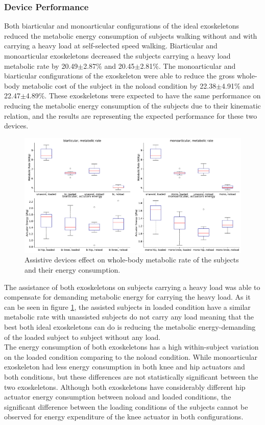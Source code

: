 \documentclass[10pt,letterpaper]{article}
\begin{document}
\subsubsection*{Device Performance}
Both biarticular and monoarticular configurations of the ideal exoskeletons reduced the metabolic energy consumption of subjects walking without and with carrying a heavy load at self-selected speed walking. Biarticular and monoarticular exoskeletons decreased the subjects carrying a heavy load metabolic rate by 20.49$\pm$2.87\% and 20.45$\pm$2.81\%. The monoarticular and biarticular configurations of the exoskeleton were able to reduce the gross whole-body metabolic cost of the subject in the noload condition by 22.38$\pm$4.91\% and 22.47$\pm$4.89\%. These exoskeletons were expected to have the same performance on reducing the metabolic energy consumption of the subjects due to their kinematic relation, and the results are representing the expected performance for these two devices.\\
\begin{figure}[h]   
	\centering
	\includegraphics[scale=0.35]{Ideal_Exo_MonovsBi_Figures/Paper_Figure_Energy_BoxPlot.pdf}
	\caption{Assistive devices effect on whole-body metabolic rate of the subjects and their energy consumption.}
	\label{Fig_IdealExo_Energy_BoxPlot}
\end{figure}
The assistance of both exoskeletons on subjects carrying a heavy load was able to compensate for demanding metabolic energy for carrying the heavy load. As it can be seen in figure \ref{Fig_IdealExo_Energy_BoxPlot}, the assisted subjects in loaded condition have a similar metabolic rate with unassisted subjects do not carry any load meaning that the best both ideal exoskeletons can do is reducing the metabolic energy-demanding of the loaded subject to subject without any load.\\
The energy consumption of both exoskeletons has a high within-subject variation on the loaded condition comparing to the noload condition. While monoarticular exoskeleton had less energy consumption in both knee and hip actuators and both conditions, but these differences are not statistically significant between the two exoskeletons.  Although both exoskeletons have considerably different hip actuator energy consumption between noload and loaded conditions, the significant difference between the loading conditions of the subjects cannot be observed for energy expenditure of the knee actuator in both configurations.\\
\end{document}
